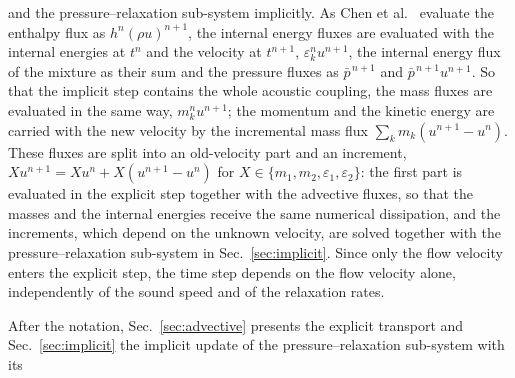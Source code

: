 and the pressure--relaxation sub-system implicitly. As Chen et al.\ \cite{Chen2026} evaluate the enthalpy flux as $h^n(\rho u)^{n+1}$,
the internal energy fluxes are evaluated with the internal energies at $t^n$ and the velocity at $t^{n+1}$, $\varepsilon^n_ku^{n+1}$, the internal
energy flux of the mixture as their sum and the pressure fluxes as $\bar p^{\,n+1}$ and $\bar p^{\,n+1}u^{n+1}$. So that the implicit step contains the whole
acoustic coupling, the mass fluxes are evaluated in the same way, $m^n_ku^{n+1}$; the momentum and the kinetic energy are carried
with the new velocity by the incremental mass flux $\sum_km_k(u^{n+1}-u^n)$. These fluxes are split into an old-velocity part and an
increment, $Xu^{n+1}=Xu^n+X(u^{n+1}-u^n)$ for $X\in\{m_1,m_2,\varepsilon_1,\varepsilon_2\}$: the first part is evaluated in the explicit step together with the advective fluxes, so that the masses and the internal energies receive the same
numerical dissipation, and the increments, which depend on the unknown velocity, are solved together with the
pressure--relaxation sub-system in Sec.~\ref{sec:implicit}. Since only the flow velocity enters the explicit step, the time step depends
on the flow velocity alone, independently of the sound speed and of the relaxation rates.

After the notation, Sec.~\ref{sec:advective} presents the explicit
transport and Sec.~\ref{sec:implicit} the implicit update of the pressure--relaxation sub-system with its

